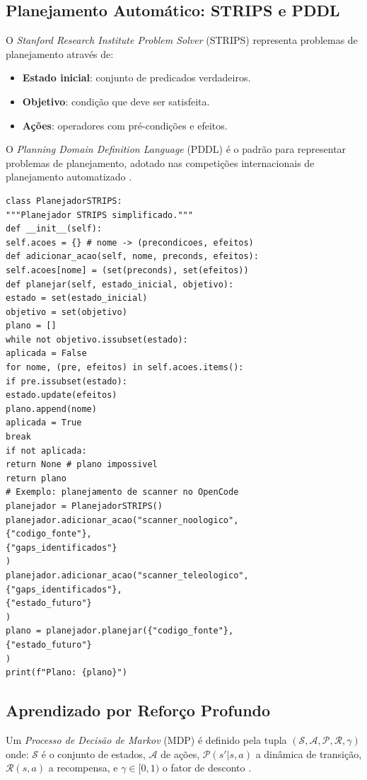 \subsection{Planejamento Automático: STRIPS e PDDL}
\begin{definicao}[STRIPS]
O \textit{Stanford Research Institute Problem Solver} (STRIPS) representa
problemas de planejamento através de:
\begin{itemize}
\item \textbf{Estado inicial}: conjunto de predicados verdadeiros.
\item \textbf{Objetivo}: condição que deve ser satisfeita.
\item \textbf{Ações}: operadores com pré-condições e efeitos.
\end{itemize}
\cite{fikes1971strips}
\end{definicao}
\begin{definicao}[PDDL]
O \textit{Planning Domain Definition Language} (PDDL) é o padrão para
representar problemas de planejamento, adotado nas competições
internacionais de planejamento automatizado \cite{mcdermott1998pddl}.
\end{definicao}
\begin{lstlisting}[style=pythonstyle]
class PlanejadorSTRIPS:
"""Planejador STRIPS simplificado."""
def __init__(self):
self.acoes = {} # nome -> (precondicoes, efeitos)
def adicionar_acao(self, nome, preconds, efeitos):
self.acoes[nome] = (set(preconds), set(efeitos))
def planejar(self, estado_inicial, objetivo):
estado = set(estado_inicial)
objetivo = set(objetivo)
plano = []
while not objetivo.issubset(estado):
aplicada = False
for nome, (pre, efeitos) in self.acoes.items():
if pre.issubset(estado):
estado.update(efeitos)
plano.append(nome)
aplicada = True
break
if not aplicada:
return None # plano impossivel
return plano
# Exemplo: planejamento de scanner no OpenCode
planejador = PlanejadorSTRIPS()
planejador.adicionar_acao("scanner_noologico",
{"codigo_fonte"},
{"gaps_identificados"}
)
planejador.adicionar_acao("scanner_teleologico",
{"gaps_identificados"},
{"estado_futuro"}
)
plano = planejador.planejar({"codigo_fonte"},
{"estado_futuro"}
)
print(f"Plano: {plano}")
\end{lstlisting}
\subsection{Aprendizado por Reforço Profundo}
\begin{definicao}[MDP]
Um \textit{Processo de Decisão de Markov} (MDP) é definido pela tupla
$(\mathcal{S}, \mathcal{A}, \mathcal{P}, \mathcal{R}, \gamma)$ onde:
$\mathcal{S}$ é o conjunto de estados, $\mathcal{A}$ de ações,
$\mathcal{P}(s'|s,a)$ a dinâmica de transição, $\mathcal{R}(s,a)$ a
recompensa, e $\gamma \in [0,1)$ o fator de desconto
\cite{sutton2018reinforcement}.
\end{definicao}
